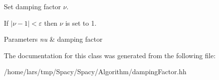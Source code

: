 Set damping factor $\nu$. 

If $ |\nu-1| < \varepsilon $ then $\nu$ is set to 1.


\begin{DoxyParams}{Parameters}
{\em nu} & damping factor \\
\hline
\end{DoxyParams}


The documentation for this class was generated from the following file\+:\begin{DoxyCompactItemize}
\item 
/home/lars/tmp/\+Spacy/\+Spacy/\+Algorithm/damping\+Factor.\+hh\end{DoxyCompactItemize}
